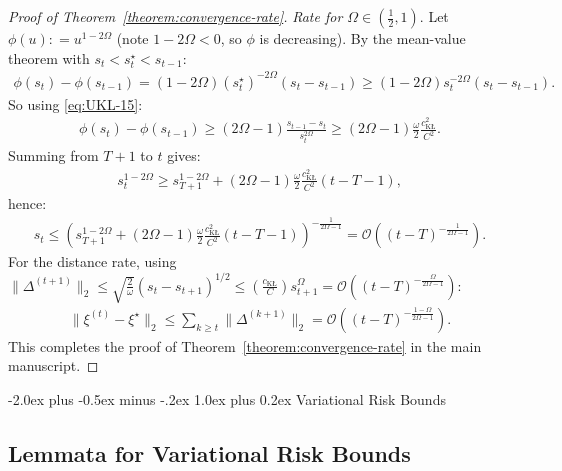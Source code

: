 \documentclass[12pt]{article}
\makeatletter
\def\section{\@startsection{section}{1}{\z@}
  {-2.0ex plus -0.5ex minus -.2ex} %
  {1.0ex plus 0.2ex}               %
  {\normalfont\Large\bfseries}}
\numberwithin{equation}{section}
\makeatother
\begin{document}
\begin{proof}[Proof of Theorem~\ref{theorem:convergence-rate}]
\noindent
\emph{Rate for $\Omega \in (\frac{1}{2}, 1)$}. Let $\phi(u): = u^{1-2\Omega}$ (note $1-2\Omega <0$, so $\phi$ is decreasing). By the mean-value theorem with $s_t<s^{\star}_t< s_{t-1}$:
\begin{align}\label{eq:UKL-17}
    \phi(s_t) - \phi(s_{t-1}) = (1-2\Omega)(s^{\star}_t)^{-2\Omega}(s_t-s_{t-1}) \geq (1-2\Omega)s_t^{-2\Omega}(s_t-s_{t-1}).
\end{align}
So using \eqref{eq:UKL-15}:
\begin{align}\label{eq:UKL-18}
    \phi(s_t) - \phi(s_{t-1}) \geq (2\Omega-1)\frac{s_{t-1}-s_t}{s_t^{2\Omega}} \geq (2\Omega -1)\frac{\omega}{2}\frac{c_{\mathrm{K\text{\L}}}^{2}}{C^2}.
\end{align}
Summing from $T+1$ to $t$ gives:
\begin{align}\label{eq:UKL-19}
    s_t^{1-2\Omega} \geq s_{T+1}^{1-2\Omega} + (2\Omega - 1)\frac{\omega}{2}\frac{c_{\mathrm{K\text{\L}}}^{2}}{C^2}(t-T-1),
\end{align}
hence:
\begin{align}\label{eq:UKL-20}
    s_t \leq \left(s^{1-2\Omega}_{T+1} + (2\Omega-1)\frac{\omega}{2}\frac{c_{\mathrm{K\text{\L}}}^{2}}{C^2}(t-T-1)\right)^{-\frac{1}{2\Omega -1}} = \mathcal{O}\left((t-T)^{-\frac{1}{2\Omega -1}}\right).
\end{align}
For the distance rate, using $\lVert \Delta^{(t+1)}\rVert_2 \leq \sqrt{\tfrac{2}{\omega}}(s_t-s_{t+1})^{1/2} \leq (\tfrac{c_{\mathrm{K\text{\L}}}}{C})s_{t+1}^{\Omega} = \mathcal{O}\left((t-T)^{-\frac{\Omega}{2\Omega -1}}\right)$:
\begin{align}\label{eq:UKL-21}
    \lVert \xi^{(t)} - \xi^{\star}\rVert_2 \leq \sum_{k\geq t}\lVert \Delta^{(k+1)}\rVert_2 = \mathcal{O}\left((t-T)^{-\frac{1-\Omega}{2\Omega -1}}\right).
\end{align}
This completes the proof of Theorem~\ref{theorem:convergence-rate} in the main manuscript.

\end{proof}

\newpage

\section{Variational Risk Bounds}\label{app:variational-risk-bounds}

\subsection{Lemmata for Variational Risk Bounds}\label{app:lemmata-variatonal-risk-bounds-general}
\end{document}

